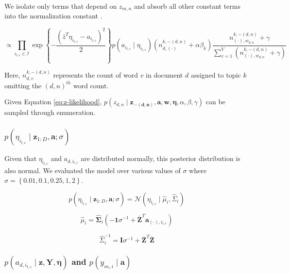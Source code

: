 \documentclass{article}
\begin{document}
We isolate only terms that depend on $z_{m,n}$ and absorb all other
constant terms into the normalization constant \citep{Griffiths04}.

\begin{equation}
\propto\prod_{i_{l,c}\in\mathcal{I}}\exp\left\{ -\frac{\left(\bar{z}^{T}\eta_{i_{l,c}}-a_{i_{l,c}}\right)^{2}}{2}\right\} p\left(a_{i_{l,c}}\mid\eta_{i_{l,c}}\right)\left(n_{d,\left(\cdot\right)}^{k,-\left(d,n\right)}+\alpha\beta_{k}\right)\frac{n_{\left(\cdot\right),w_{d,n}}^{k,-\left(d,n\right)}+\gamma}{\sum_{v=1}^{V}\left(n_{\left(\cdot\right),w_{d,n}}^{k,-\left(d,n\right)}+\gamma\right)}\label{eq:z-likelihood}\end{equation}


Here, $n_{d,v}^{k,-\left(d,n\right)}$ represents the count of word
$v$ in document $d$ assigned to topic $k$ omitting the $(d,n)^{th}$
word count.

Given Equation \ref{eq:z-likelihood}, $p\left(z_{d,n}\mid\mathbf{z_{-\left(d,n\right)}},\mathbf{a},\mathbf{w},\mathbf{\eta},\alpha,\beta,\gamma\right)$
can be sampled through enumeration.


\subsubsection{$p\left(\eta_{i_{l,c}}\mid\mathbf{z}_{1:D},\mathbf{a};\sigma\right)$}

Given that $\eta_{i_{l,c}}$ and $a_{d,i_{l,c}}$ are distributed
normally, this posterior distribution is also normal. We evaluated
the model over various values of $\sigma$ where $\sigma=\left\{ 0.01,0.1,0.25,1,2\right\} $.

\begin{equation}
p\left(\eta_{i_{l,c}}\mid\mathbf{z}_{1:D},\mathbf{a};\sigma\right)=\mathcal{N}\left(\eta_{i_{l,c}}\mid\hat{\mu}_{i},\hat{\Sigma}_{i}\right)\end{equation}


\[
\hat{\mu}_{i}=\hat{\mathbf{\Sigma}}_{i}\left(-\mathbf{1}\sigma^{-1}+\bar{\mathbf{Z}}^{T}\mathbf{a}_{\left(\cdot\right),i_{l,c}}\right)\]


\[
\hat{\Sigma}_{i}^{-1}=\mathbf{I}\sigma^{-1}+\bar{\mathbf{Z}}^{T}\bar{\mathbf{Z}}\]



\subsubsection{$p\left(a_{d,i_{l,c}}\mid\mathbf{z},\mathbf{Y},\mathbf{\eta}\right)$
and \textmd{$p\left(y_{m,i}\mid\mathbf{a}\right)$}}
\end{document}
